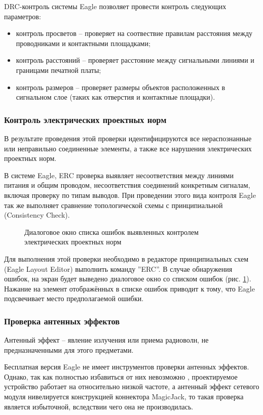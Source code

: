 DRC-контроль системы Eagle позволяет провести контроль следующих параметров:
\begin{itemize}
	\item{} контроль просветов -- проверяет на соотвествие правилам расстояния между
		проводниками и контактными площадками;
	\item{} контроль расстояний -- проверяет расстояние между сигнальными
		линиями и границами печатной платы;
	\item{} контроль размеров -- проверяет размеры объектов расположенных в сигнальном
		слое (таких как отверстия и контактные площадки).
\end{itemize}

\subsubsection{Контроль электрических проектных норм}
В результате проведения этой проверки идентифицируются все нераспознанные или
неправильно соединенные элементы, а также все нарушения электрических проектных норм.

В системе Eagle, ERC проверка выявляет несоответствия между линиями питания и общим проводом,
несоответствия соединений конкретным сигналам, включая проверку по типам выводов.
При проведении этого вида контроля Eagle так же выполняет сравнение топологической схемы
с принципиальной (Consistency Check).

\begin{figure}[ht]
	\caption{Диалоговое окно списка ошибок выявленных контролем электрических проектных норм}
	\label{img:erc}
\end{figure}

Для выполнения этой проверки необходимо в редакторе принципиальных схем (Eagle Layout Editor)
выполнить команду ''ERC''. В случае обнаружения ошибок, на экран будет выведено диалоговое окно
со списком ошибок (рис. \ref{img:erc}). Нажание на элемент отображённых в списке ошибок приводит
к тому, что Eagle подсвечивает место предполагаемой ошибки.


\subsubsection{Проверка антенных эффектов}
Антенный эффект --  явление излучения или приема радиоволн, не предназначенными для этого
предметами.

Бесплатная версия Eagle не имеет инструментов проверки антенных эффектов. Однако, так как
полностью избавиться от них невозможно \cite{antennaeff}, проектируемое устройство работает
на относительно низкой частоте, а антенный эффект сетевого модуля нивелируется конструкцией
коннектора MagicJack, то такая проверка является избыточной, вследствии чего
она не производилась.
